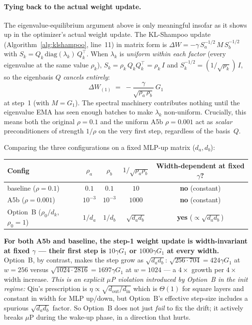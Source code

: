 \paragraph{Tying back to the actual weight update.}
The eigenvalue-equilibrium argument above is only meaningful insofar as
it shows up in the optimizer's actual weight update. The KL-Shampoo
update (Algorithm~\ref{alg:klshampoo}, line~11) in matrix form is
$\Delta W = -\gamma\, S_a^{-1/2}\, M\, S_b^{-1/2}$ with
$S_k = Q_k\,\mathrm{diag}(\lambda_k)\,Q_k^\top$. When $\lambda_k$ is
\emph{uniform within each factor} (every eigenvalue at the same value
$\rho_k$), $S_k = \rho_k\,Q_k Q_k^\top = \rho_k\,I$ and
$S_k^{-1/2} = (1/\sqrt{\rho_k})\,I$, so the eigenbasis $Q$ \emph{cancels
entirely}:
\begin{equation}
\Delta W_{(1)} \;=\; -\frac{\gamma}{\sqrt{\rho_a\,\rho_b}}\,G_1
\label{eq:step1-update}
\end{equation}
at step~1 (with $M{=}G_1$). The spectral machinery contributes nothing
until the eigenvalue EMA has seen enough batches to make $\lambda_k$
non-uniform. Crucially, this means both the original $\rho{=}0.1$ and
the uniform A5b $\rho{=}0.001$ act as \emph{scalar} preconditioners of
strength $1/\rho$ on the very first step, regardless of the basis~$Q$.

Comparing the three configurations on a fixed MLP-up matrix
($d_a, d_b$):
\begin{center}
\small
\begin{tabular}{l c c c c}
\toprule
Config & $\rho_a$ & $\rho_b$ & $1/\!\sqrt{\rho_a\rho_b}$
       & Width-dependent at fixed $\gamma$? \\
\midrule
baseline ($\rho{=}0.1$) & $0.1$ & $0.1$ & $10$ & \textbf{no} (constant) \\
A5b ($\rho{=}0.001$) & $10^{-3}$ & $10^{-3}$ & $1000$ & \textbf{no} (constant) \\
Option~B ($\rho_0/d_k$, $\rho_0{=}1$) & $1/d_a$ & $1/d_b$ & $\sqrt{d_a d_b}$ & \textbf{yes} ($\propto\!\!\sqrt{d_a d_b}$) \\
\bottomrule
\end{tabular}
\end{center}
\textbf{For both A5b and baseline, the step-1 weight update is
width-invariant at fixed $\gamma$ --- their first step is $10\gamma G_1$
or $1000\gamma G_1$ at every width.} Option~B, by contrast, makes the
step grow as $\sqrt{d_a d_b}$: $\sqrt{256\cdot 704}{=}424\gamma G_1$ at
$w{=}256$ versus $\sqrt{1024\cdot 2816}{=}1697\gamma G_1$ at $w{=}1024$
--- a $4\!\times$ growth per $4\!\times$ width increase. \emph{This is
an explicit $\mu$P violation introduced by Option~B in the init regime:}
Qiu's prescription is $\eta\!\propto\!\sqrt{d_\mathrm{out}/d_\mathrm{in}}$
which is $\Theta(1)$ for square layers and constant in width for MLP
up/down, but Option~B's effective step-size includes a spurious
$\sqrt{d_a d_b}$ factor. So Option~B does not just \emph{fail} to fix
the drift; it actively breaks $\mu$P during the wake-up phase, in a
direction that hurts.

